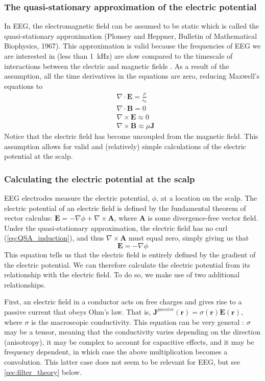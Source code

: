 \subsubsection{The quasi-stationary approximation of the electric potential}
In EEG, the electromagnetic field can be assumed to be static which is called the quasi-stationary approximation (Plonsey and Heppner, Bulletin of Mathematical Biophysics, 1967). This approximation is valid because the frequencies of EEG we are interested in (less than \qty{1}{\kilo\hertz}) are slow compared to the timescale of interactions between the electric and magnetic fields \cite{RevModPhys.65.413}. As a result of the assumption, all the time derivatives in the equations are zero, reducing Maxwell's equations to
\begin{align}
    & \nabla \cdot \bm{E} = \frac{\rho}{\epsilon_0} \\
    & \nabla \cdot \bm{B} = 0 \\ 
    & \nabla \times \bm{E} \approx 0 \label{eq:QSA_induction} \\ 
    & \nabla \times \bm{B} \approx \mu \bm{J} \label{eq:QSA_amp_law}
\end{align}
Notice that the electric field has become uncoupled from the magnetic field. This assumption allows for valid and (relatively) simple calculations of the electric potential at the scalp.

\subsubsection{Calculating the electric potential at the scalp}
EEG electrodes measure the electric potential, $\phi$, at a location on the scalp. The electric potential of an electric field is defined by the fundamental theorem of vector calculus: $\bm{E} = - \nabla \phi + \nabla \times \bm{A}$, where $\bm{A}$ is some divergence-free vector field. Under the quasi-stationary approximation, the electric field has no curl (\ref{eq:QSA_induction}), and thus $\nabla \times \bm{A}$ must equal zero, simply giving us that 
\begin{equation} \label{eq:potential}
\bm{E} = -\nabla \phi
\end{equation}
This equation tells us that the electric field is entirely defined by the gradient of the electric potential. We can therefore calculate the electric potential from its relationship with the electric field. To do so, we make use of two additional relationships.

First, an electric field in a conductor acts on free charges and gives rise to a passive current that obeys Ohm's law. That is, $\bm{J}^{passive}(\bm{r}) = \sigma(\bm{r}) \bm{E}(\bm{r})$, where $\sigma$ is the macroscopic conductivity. This equation can be very general \cite{Pettersen2012}: $\sigma$ may be a tensor, meaning that the conductivity varies depending on the direction (anisotropy), it may be complex to account for capacitive effects, and it may be frequency dependent, in which case the above multiplication becomes a convolution. This latter case does not seem to be relevant for EEG, but see \autoref{sec:filter_theory} below.

